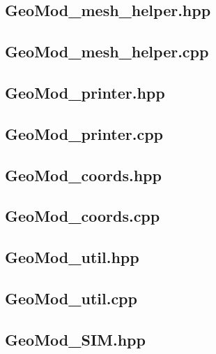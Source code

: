 \documentclass[a4paper, 12pt]{article}
\begin{document}
\subsection{GeoMod\_mesh\_helper.hpp} \label{subsec:mesh_hpp}

\subsection{GeoMod\_mesh\_helper.cpp} \label{subsec:mesh_cpp}


\subsection{GeoMod\_printer.hpp} \label{subsec:printer_hpp}

\subsection{GeoMod\_printer.cpp} \label{subsec:printer_cpp}


\subsection{GeoMod\_coords.hpp} \label{subsec:coords_hpp}

\subsection{GeoMod\_coords.cpp} \label{subsec:coords_cpp}


\subsection{GeoMod\_util.hpp} \label{subsec:util_hpp}

\subsection{GeoMod\_util.cpp} \label{subsec:util_cpp}


\subsection{GeoMod\_SIM.hpp} \label{subsec:SIM_hpp}

\end{document}
